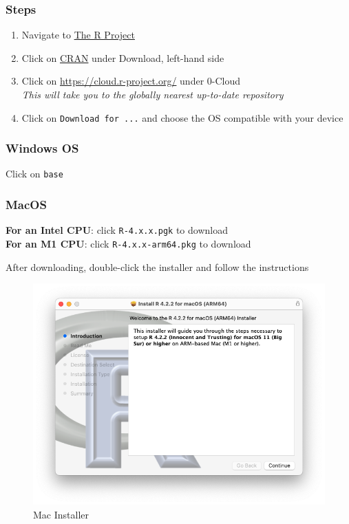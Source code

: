 \documentclass[
]{book}
\providecommand{\tightlist}{%
  \setlength{\itemsep}{0pt}\setlength{\parskip}{0pt}}
\begin{document}
\hypertarget{steps}{%
\subsubsection*{Steps}\label{steps}}

\begin{enumerate}
\def\labelenumi{\arabic{enumi}.}
\tightlist
\item
  Navigate to \href{https://www.r-project.org/}{The R Project}
\item
  Click on \href{https://cran.r-project.org/mirrors.html}{CRAN} under Download, left-hand side
\item
  Click on \url{https://cloud.r-project.org/} under 0-Cloud\\
  \emph{This will take you to the globally nearest up-to-date repository}
\item
  Click on \texttt{Download\ for\ ...} and choose the OS compatible with your device
\end{enumerate}

\hypertarget{windows-os}{%
\subsubsection*{Windows OS}\label{windows-os}}

Click on \texttt{base}

\hypertarget{macos}{%
\subsubsection*{MacOS}\label{macos}}

\textbf{For an Intel CPU}: click \texttt{R-4.x.x.pgk} to download\\
\textbf{For an M1 CPU}: click \texttt{R-4.x.x-arm64.pkg} to download

After downloading, double-click the installer and follow the instructions

\begin{figure}
\includegraphics[width=10.17in]{images/02_001_r_installer_mac_m1} \caption{\label{fig:2001}Mac Installer}\label{fig:2001}
\end{figure}
\end{document}
